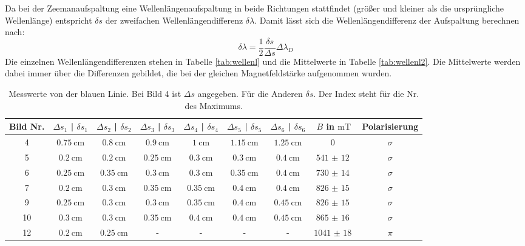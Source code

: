 \documentclass[
  bibliography=totoc,     %
  captions=tableheading,  %
  titlepage=firstiscover, %
]{scrartcl}
\begin{document}
\noindent
Da bei der Zeemanaufspaltung eine Wellenlängenaufspaltung in beide Richtungen stattfindet
(größer und kleiner als die ursprüngliche Wellenlänge) entspricht $\delta s$ der zweifachen
Wellenlängendifferenz $\delta\lambda$.
Damit lässt sich die Wellenlängendifferenz der Aufspaltung berechnen nach:
\begin{equation}
  \delta\lambda = \frac{1}{2} \frac{\delta s}{\Delta s} \Delta\lambda_D
\end{equation}
Die einzelnen Wellenlängendifferenzen stehen in Tabelle \ref{tab:wellenl} und die Mittelwerte in Tabelle \ref{tab:wellenl2}.
Die Mittelwerte werden dabei immer über die Differenzen gebildet, die bei der gleichen
Magnetfeldstärke aufgenommen wurden.
\clearpage
\begin{landscape}
  \begin{table}[H]
    \centering
    \caption{Messwerte von der blauen Linie. Bei Bild 4 ist $\Delta s$ angegeben. Für die Anderen $\delta s$. Der Index steht für die Nr. des Maximums.}
    \label{tab:aufspaltungswerte2}
    \begin{tabular}{c c c c c c c c c}
      \toprule
      Bild Nr. & $\Delta s_1$ | $\delta s_1$ & $\Delta s_2$ | $\delta s_2$ & $\Delta s_3$ | $\delta s_3$ & $\Delta s_4$ | $\delta s_4$ & $\Delta s_5$ | $\delta s_5$ & $\Delta s_6$ | $\delta s_6$ & $B$ in $\si{\milli\tesla}$ & Polarisierung \\
      \midrule
       4 & $\SI{0.75}{\centi\meter}$ & $\SI{0.8 }{\centi\meter}$ & $\SI{0.9 }{\centi\meter}$ & $\SI{1   }{\centi\meter}$ & $\SI{1.15}{\centi\meter}$ & $\SI{1.25}{\centi\meter}$ & $\SI{0}{}$ & $\sigma$ \\
       5 & $\SI{0.2 }{\centi\meter}$ & $\SI{0.2 }{\centi\meter}$ & $\SI{0.25}{\centi\meter}$ & $\SI{0.3 }{\centi\meter}$ & $\SI{0.3 }{\centi\meter}$ & $\SI{0.4 }{\centi\meter}$ & $\SI{541(12)}{}$ & $\sigma$ \\
       6 & $\SI{0.25}{\centi\meter}$ & $\SI{0.35}{\centi\meter}$ & $\SI{0.3 }{\centi\meter}$ & $\SI{0.3 }{\centi\meter}$ & $\SI{0.35}{\centi\meter}$ & $\SI{0.4 }{\centi\meter}$ & $\SI{730(14)}{}$ & $\sigma$ \\
       7 & $\SI{0.2 }{\centi\meter}$ & $\SI{0.3 }{\centi\meter}$ & $\SI{0.35}{\centi\meter}$ & $\SI{0.35}{\centi\meter}$ & $\SI{0.4 }{\centi\meter}$ & $\SI{0.4 }{\centi\meter}$ & $\SI{826(15)}{}$ & $\sigma$ \\
       9 & $\SI{0.25}{\centi\meter}$ & $\SI{0.3 }{\centi\meter}$ & $\SI{0.3 }{\centi\meter}$ & $\SI{0.35}{\centi\meter}$ & $\SI{0.4 }{\centi\meter}$ & $\SI{0.45}{\centi\meter}$ & $\SI{826(15)}{}$ & $\sigma$ \\
      10 & $\SI{0.3 }{\centi\meter}$ & $\SI{0.3 }{\centi\meter}$ & $\SI{0.35}{\centi\meter}$ & $\SI{0.4 }{\centi\meter}$ & $\SI{0.4 }{\centi\meter}$ & $\SI{0.45}{\centi\meter}$ & $\SI{865(16)}{}$ & $\sigma$ \\
      12 & $\SI{0.2 }{\centi\meter}$ & $\SI{0.25}{\centi\meter}$ & - & - & - & - & $\SI{1041(18)}{}$ & $\pi$ \\
      \bottomrule
    \end{tabular}
  \end{table}
\end{landscape}
\end{document}
